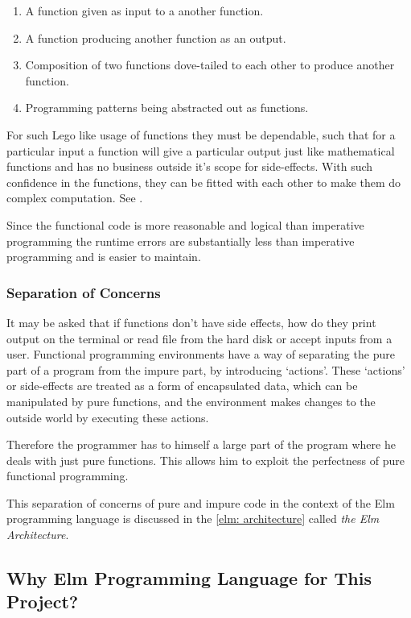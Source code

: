 \begin{enumerate}
\item A function given as input to a another function. 
\item A function producing another function as an output.
\item Composition of two functions dove-tailed to each other to produce another function.
\item Programming patterns being abstracted out as functions.
\end{enumerate}

For such Lego like usage of functions they must be dependable, such that for a
particular input a function will give a particular output just like
mathematical functions and has no business outside it's scope for side-effects.
With such confidence in the functions, they can be fitted with each other to
make them do complex computation. See \cite{Hughes89}.

Since the functional code is more reasonable and logical than imperative
programming the runtime errors are substantially less than imperative
programming and is easier to maintain.


\subsubsection{Separation of Concerns}
It may be asked that if functions don't have side effects, how do they print
output on the terminal or read file from the hard disk or accept inputs from a
user. Functional programming environments have a way of separating the pure
part of a program from the impure part, by introducing `actions'. These
`actions' or side-effects are treated as a form of encapsulated data, which
can be manipulated by pure functions, and the environment makes changes to the
outside world by executing these actions.

Therefore the programmer has to himself a large part of the program where he
deals with just pure functions. This allows him to exploit the perfectness of
pure functional programming.

This separation of concerns of pure and impure code in the context of the Elm
programming language is discussed in the \autoref{elm: architecture} called \emph{the Elm
Architecture}.

\subsection{Why Elm Programming Language for This Project?}

